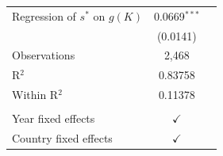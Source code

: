 \centering
\begin{tabularx}{\columnwidth}{lcc}
   Regression of $s^*$ on \(g(K)\)   & 0.0669$^{***}$\\   
                                     & (0.0141)\\   
   Observations                      & 2,468\\  
   R$^2$                             & 0.83758\\  
   Within R$^2$                      & 0.11378\\  
    \\
   Year fixed effects                & $\checkmark$\\   
   Country fixed effects             & $\checkmark$\\   
\end{tabularx}
   \label{tbl-4}

